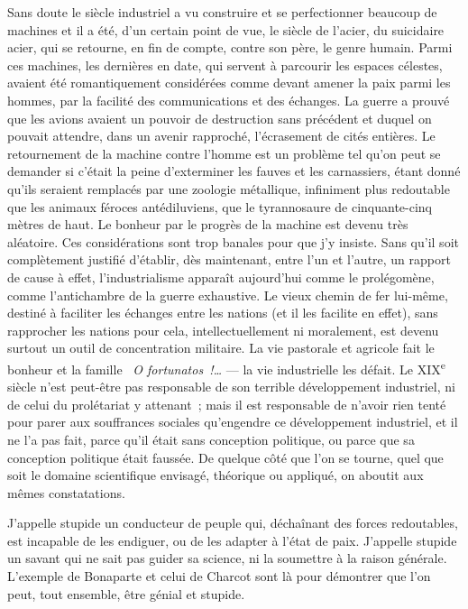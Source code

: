 \documentclass[french,twoside]{book} %
\newcommand\chapterclose{} %
\begin{document}
Sans doute le siècle industriel a vu construire et se perfectionner beaucoup de machines et il a été, d’un certain point de vue, le siècle de l’acier, du suicidaire acier, qui se retourne, en fin de compte, contre son père, le genre humain. Parmi ces machines, les dernières en date, qui servent à parcourir les espaces célestes, avaient été romantiquement considérées comme devant amener la paix parmi les hommes, par la facilité des communications et des échanges. La guerre a prouvé que les avions avaient un pouvoir de destruction sans précédent et duquel on pouvait attendre, dans un avenir rapproché, l’écrasement de cités entières. Le retournement de la machine contre l’homme est un problème tel qu’on peut se demander si c’était la peine d’exterminer les fauves et les carnassiers, étant donné qu’ils seraient remplacés par une zoologie métallique, infiniment plus redoutable que les animaux féroces antédiluviens, que le tyrannosaure de cinquante-cinq mètres de haut. Le bonheur par le progrès de la machine est devenu très aléatoire. Ces considérations sont trop banales pour que j’y insiste. Sans qu’il soit complètement justifié d’établir, dès maintenant, entre l’un et l’autre, un rapport de cause à effet, l’industrialisme apparaît aujourd’hui comme le prolégomène, comme l’antichambre de la guerre exhaustive. Le vieux chemin de fer lui-même, destiné à faciliter les échanges entre les nations (et il les facilite en effet), sans rapprocher les nations pour cela, intellectuellement ni moralement, est devenu surtout un outil de concentration militaire. La vie pastorale et agricole fait le bonheur et la famille  {\itshape O fortunatos !…} — la vie industrielle les défait. Le XIX\textsuperscript{e} siècle n’est peut-être pas responsable de son terrible développement industriel, ni de celui du prolétariat y attenant ; mais il est responsable de n’avoir rien tenté pour parer aux souffrances sociales qu’engendre ce développement industriel, et il ne l’a pas fait, parce qu’il était sans conception politique, ou parce que sa conception politique était faussée. De quelque côté que l’on se tourne, quel que soit le domaine scientifique envisagé, théorique ou appliqué, on aboutit aux mêmes constatations.\par
J’appelle stupide un conducteur de peuple qui, déchaînant des forces redoutables, est incapable de les endiguer, ou de les adapter à l’état de paix. J’appelle stupide un savant qui ne sait pas guider sa science, ni la soumettre à la raison générale. L’exemple de Bonaparte et celui de Charcot sont là pour démontrer que l’on peut, tout ensemble, être génial et stupide.
\chapterclose
\end{document}
